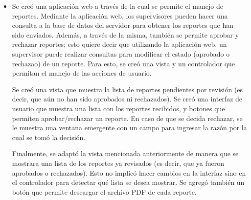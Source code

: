 \begin{itemize}
\item Se creó una aplicación web a través de la cual se permite el manejo de reportes. Mediante la aplicación web, los supervisores pueden hacer una consulta a la base de datos del servidor para obtener los reportes que han sido enviados. Además, a través de la misma, también se permite aprobar y rechazar reportes; esto quiere decir que utilizando la aplicación web, un supervisor puede realizar consultas para modificar el estado (aprobado o rechazao) de un reporte. Para esto, se creó una vista y un controlador que permitan el manejo de las acciones de usuario. 

Se creó una vista que muestra la lista de reportes pendientes por revisión (es decir, que aún no han sido aprobados ni rechazados). Se creó una interfaz de usuario que muestra una lista con los reportes recibidos, y botones que permiten aprobar/rechazar un reporte. En caso de que se decida rechazar, se le muestra una ventana emergente con un campo para ingresar la razón por la cual se tomó la decisión.

Finalmente, se adaptó la vista mencionada anteriormente de manera que se mostrara una lista de los reportes ya revisados (es decir, que ya fueron aprobados o rechazados). Esto no implicó hacer cambios en la interfaz sino en el controlador para detectar qué lista se desea mostrar. Se agregó también un botón que permite descargar el archivo PDF de cada reporte.
\end{itemize}
%
%
%
%
